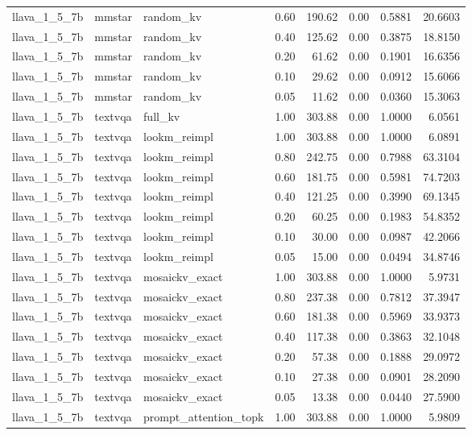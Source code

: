 \begin{longtable}{lllrrrrr}
llava\_1\_5\_7b & mmstar & random\_kv & 0.60 & 190.62 & 0.00 & 0.5881 & 20.6603 \\
llava\_1\_5\_7b & mmstar & random\_kv & 0.40 & 125.62 & 0.00 & 0.3875 & 18.8150 \\
llava\_1\_5\_7b & mmstar & random\_kv & 0.20 & 61.62 & 0.00 & 0.1901 & 16.6356 \\
llava\_1\_5\_7b & mmstar & random\_kv & 0.10 & 29.62 & 0.00 & 0.0912 & 15.6066 \\
llava\_1\_5\_7b & mmstar & random\_kv & 0.05 & 11.62 & 0.00 & 0.0360 & 15.3063 \\
llava\_1\_5\_7b & textvqa & full\_kv & 1.00 & 303.88 & 0.00 & 1.0000 & 6.0561 \\
llava\_1\_5\_7b & textvqa & lookm\_reimpl & 1.00 & 303.88 & 0.00 & 1.0000 & 6.0891 \\
llava\_1\_5\_7b & textvqa & lookm\_reimpl & 0.80 & 242.75 & 0.00 & 0.7988 & 63.3104 \\
llava\_1\_5\_7b & textvqa & lookm\_reimpl & 0.60 & 181.75 & 0.00 & 0.5981 & 74.7203 \\
llava\_1\_5\_7b & textvqa & lookm\_reimpl & 0.40 & 121.25 & 0.00 & 0.3990 & 69.1345 \\
llava\_1\_5\_7b & textvqa & lookm\_reimpl & 0.20 & 60.25 & 0.00 & 0.1983 & 54.8352 \\
llava\_1\_5\_7b & textvqa & lookm\_reimpl & 0.10 & 30.00 & 0.00 & 0.0987 & 42.2066 \\
llava\_1\_5\_7b & textvqa & lookm\_reimpl & 0.05 & 15.00 & 0.00 & 0.0494 & 34.8746 \\
llava\_1\_5\_7b & textvqa & mosaickv\_exact & 1.00 & 303.88 & 0.00 & 1.0000 & 5.9731 \\
llava\_1\_5\_7b & textvqa & mosaickv\_exact & 0.80 & 237.38 & 0.00 & 0.7812 & 37.3947 \\
llava\_1\_5\_7b & textvqa & mosaickv\_exact & 0.60 & 181.38 & 0.00 & 0.5969 & 33.9373 \\
llava\_1\_5\_7b & textvqa & mosaickv\_exact & 0.40 & 117.38 & 0.00 & 0.3863 & 32.1048 \\
llava\_1\_5\_7b & textvqa & mosaickv\_exact & 0.20 & 57.38 & 0.00 & 0.1888 & 29.0972 \\
llava\_1\_5\_7b & textvqa & mosaickv\_exact & 0.10 & 27.38 & 0.00 & 0.0901 & 28.2090 \\
llava\_1\_5\_7b & textvqa & mosaickv\_exact & 0.05 & 13.38 & 0.00 & 0.0440 & 27.5900 \\
llava\_1\_5\_7b & textvqa & prompt\_attention\_topk & 1.00 & 303.88 & 0.00 & 1.0000 & 5.9809 \\

\end{longtable}

